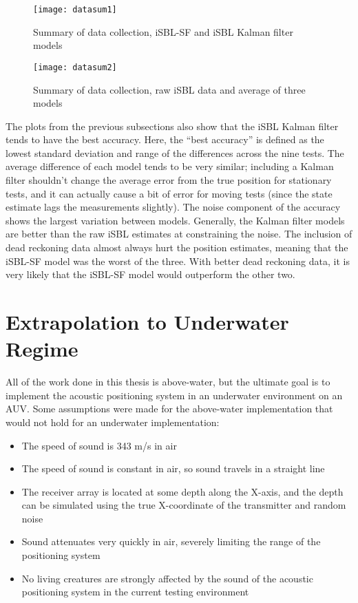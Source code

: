 \documentclass[11pt]{ucthesisCP}
\begin{document}
\pagebreak

\begin{figure}[htbp]
	\centering
	\texttt{[image: datasum1]}
	\caption{Summary of data collection, iSBL-SF and iSBL Kalman filter models}
	\label{fig:datasum1}
\end{figure}

\begin{figure}[htbp]
	\centering
	\texttt{[image: datasum2]}
	\caption{Summary of data collection, raw iSBL data and average of three models}
	\label{fig:datasum2}
\end{figure}

The plots from the previous subsections also show that the iSBL Kalman filter tends to have the best accuracy. Here, the “best accuracy” is defined as the lowest standard deviation and range of the differences across the nine tests. The average difference of each model tends to be very similar; including a Kalman filter shouldn’t change the average error from the true position for stationary tests, and it can actually cause a bit of error for moving tests (since the state estimate lags the measurements slightly). The noise component of the accuracy shows the largest variation between models. Generally, the Kalman filter models are better than the raw iSBL estimates at constraining the noise. The inclusion of dead reckoning data almost always hurt the position estimates, meaning that the iSBL-SF model was the worst of the three. With better dead reckoning data, it is very likely that the iSBL-SF model would outperform the other two.

\section{Extrapolation to Underwater Regime} \label{sec:6s3}
All of the work done in this thesis is above-water, but the ultimate goal is to implement the acoustic positioning system in an underwater environment on an AUV. Some assumptions were made for the above-water implementation that would not hold for an underwater implementation:
\begin{itemize}[noitemsep,topsep=0pt,]
	\item The speed of sound is 343 m/s in air
	\item The speed of sound is constant in air, so sound travels in a straight line
	\item The receiver array is located at some depth along the X-axis, and the depth can be simulated using the true X-coordinate of the transmitter and random noise
	\item Sound attenuates very quickly in air, severely limiting the range of the positioning system
	\item No living creatures are strongly affected by the sound of the acoustic positioning system in the current testing environment
\end{itemize}
\end{document}
